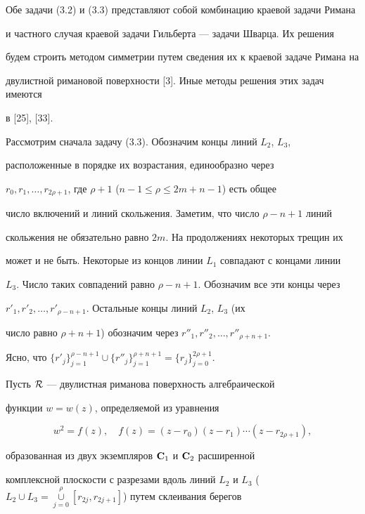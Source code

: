  


Обе задачи (3.2) и (3.3) представляют собой комбинацию краевой задачи Римана 


и частного случая краевой задачи Гильберта --- задачи Шварца. Их решения 


будем строить методом симметрии путем сведения их к краевой задаче Римана на 


двулистной римановой поверхности [3]. Иные методы решения этих задач имеются 


в [25], [33]. 


 


Рассмотрим сначала задачу (3.3). Обозначим концы линий $L_2$, $L_3$, 


расположенные в порядке их возрастания, единообразно через 


$r_0,r_1,\dotsc,r_{2\rho+1}$, где $\rho+1$ ($n-1\le\rho\le2m+n-1$) есть общее 


число включений и линий скольжения. Заметим, что число $\rho-n+1$ линий 


скольжения не обязательно равно $2m$. На продолжениях некоторых трещин их 


может и не быть. Некоторые из концов линии $L_1$ совпадают с концами линии 


$L_3$. Число таких совпадений равно $\rho-n+1$. Обозначим все эти концы через 


$r'_1,r'_2,\dotsc,r'_{\rho-n+1}$. Остальные концы линий $L_2$, $L_3$ (их 


число равно $\rho+n+1$) обозначим через $r''_1,r''_2,\dotsc,r''_{\rho+n+1}$. 


Ясно, что $\{r'_j\}^{\rho-n+1}_{j=1}\cup\{r''_j\}^{\rho+n+1}_{j=1}= 


\{r_j\}^{2\rho+1}_{j=0}$. 


 


Пусть $\cal R$ --- двулистная риманова поверхность алгебраической 


функции $w=w(z)$, определяемой из уравнения 


$$ 


w^2=f(z),\quad f(z)=(z-r_0)(z-r_1)\dotsb(z-r_{2\rho+1}), 


$$ 


образованная из двух экземпляров $\bold C_1$ и $\bold C_2$ расширенной 


комплексной плоскости с разрезами вдоль линий $L_2$ и $L_3$ ($L_2\cup L_3= 


\mathop{\cup}\limits^\rho_{j=0}[r_{2j},r_{2j+1}]$) путем склеивания берегов 


